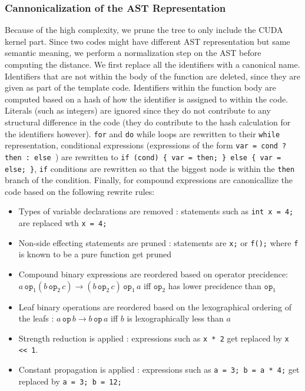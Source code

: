\documentclass[nocopyrightspace]{sigchi}
\begin{document}
\subsubsection{Cannonicalization of the AST Representation}

Because of the high complexity, we prune the tree to only include the CUDA kernel part.
Since two codes might have different AST representation but same semantic meaning,
we perform a normalization step on the AST before computing the distance.
We first replace all the identifiers with a canonical name. Identifiers that are not within
the body of the function are deleted, since they are given as part of the template code.
Identifiers within the function body are computed based on
a hash of how the identifier is assigned to within the code.
Literals (such as integers) are ignored since they do not contribute to any structural
difference in the code (they do contribute to the hash calculation for the identifiers however).
{\tt for} and {\tt do} while loops are rewritten to their {\tt while} representation,
conditional expressions (expressions of the form {\tt var = cond ? then : else }) are rewritten
to {\tt if (cond) \{ var = then; \} else \{ var = else; \}},
{\tt if} conditions are rewritten so that the biggest node is within the {\tt then} branch
of the condition. Finally, for compound expressions are canonicallize the code based on the
following rewrite rules:

\begin{itemize}
  \item Types of variable declarations are removed : statements such as {\tt int x = 4;}
  are replaced wth {\tt x = 4;}
  \item Non-side effecting statements are pruned : statements are {\tt x;} or {\tt f();} where
  {\tt f} is known to be a pure function get pruned
  \item Compound binary expressions are reordered based on operator precidence:
  $a \, \mathtt{op}_1  (b \, \mathtt{op}_2 \, c) \rightarrow (b \, \mathtt{op}_2 \, c) \, \mathtt{op}_1 \, a$
  iff $\mathtt{op}_2$ has lower precidence than $\mathtt{op}_1$
  \item Leaf binary operations are reordered based on the lexographical ordering
  of the leafs :
  $a \, \mathtt{op} \, b \rightarrow b \, \mathtt{op} \, a$ iff $b$ is lexographically less than $a$
  \item Strength reduction is applied : expressions such as {\tt x * 2} get replaced by {\tt x << 1}.
  \item Constant propagation is applied : expressions such as {\tt a = 3; b = a * 4;} get replaced
  by {\tt a = 3; b = 12;}
\end{itemize}
\end{document}
